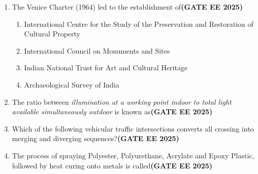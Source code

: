 \documentclass[journal,12pt,onecolumn]{IEEEtran}
\theoremstyle{remark}
\begin{document}
\begin{enumerate}
\item The Venice Charter (1964) led to the establishment of\hfill \textbf{(GATE EE 2025)}
\begin{enumerate}
    \item International Centre for the Study of the Preservation and Restoration of Cultural Property 
    \item International Council on Monuments and Sites 
    \item Indian National Trust for Art and Cultural Heritage 
    \item Archaeological Survey of India 
\end{enumerate}
\item The ratio between \textit{illumination at a working point indoor to total light available simultaneously outdoor} is known as\hfill \textbf{(GATE EE 2025)}
\begin{enumerate}
\end{enumerate}
\item Which of the following vehicular traffic intersections converts all crossing into merging and diverging sequences?\hfill \textbf{(GATE EE 2025)}
\begin{enumerate}
\end{enumerate}
\item The process of spraying Polyester, Polyurethane, Acrylate and Epoxy Plastic, followed by heat curing onto metals is called\hfill \textbf{(GATE EE 2025)}
\begin{enumerate}
\end{enumerate}
\end{enumerate}
\end{document}
